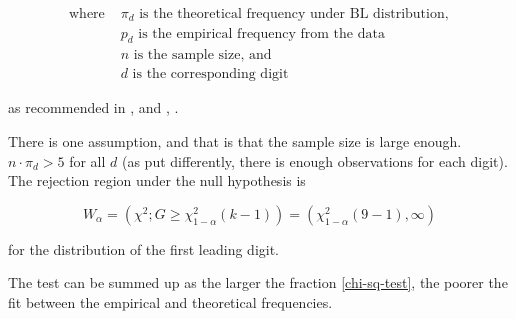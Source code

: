 \begin{align*}
    \text{where } &\pi_d \text{ is the theoretical frequency under BL distribution}, \\
    &p_d \text{ is the empirical frequency from the data} \\ 
    &n \text{ is the sample size, and} \\
    &d \text{ is the corresponding digit}
\end{align*} 

as recommended in \citeauthor{Hronova2023}, \citeyear{Hronova2023} and  \citeauthor{kossovsky2014benford}, \citeyear{kossovsky2014benford}. 

There is one assumption, and that is that the sample size is large enough.  
$n \cdot \pi_d > 5$ for all $d$ (as put differently, there is enough observations for each digit). The rejection region under the null hypothesis is 

\begin{equation}
    W_\alpha = \left( \chi^2; G \ge \chi^2_{1-\alpha}(k-1) \right) = (\chi^2_{1-\alpha}(9-1), \infty)
\end{equation}

for the distribution of the first leading digit.

The test can be summed up as the larger the fraction \ref{chi-sq-test}, the poorer the fit between the empirical and theoretical frequencies.





